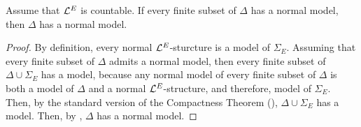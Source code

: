 \begin{boxtheorem}
    Assume that $\mathcal{L}^{E}$ is countable. If every finite subset of $\Delta$ has a normal model, then $\Delta$ has a normal model.
\end{boxtheorem}
\begin{proof}
    By definition, every normal $\mathcal{L}^{E}$-sturcture is a model of $\Sigma_E$. Assuming that every finite subset of $\Delta$ admits a normal model, then every finite subset of $\Delta \cup \Sigma_{E}$ has a model, because any normal model of every finite subset of $\Delta$ is both a model of $\Delta$ and a normal $\mathcal{L}^{E}$-structure, and therefore, model of $\Sigma_E$. Then, by the standard version of the Compactness Theorem (), $\Delta \cup \Sigma_E$ has a model. Then, by , $\Delta$ has a normal model.
\end{proof}
